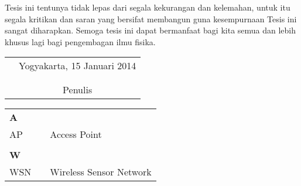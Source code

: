 \documentclass{jtetiskripsi}
\begin{document}
Tesis ini tentunya tidak lepas dari segala kekurangan dan kelemahan, untuk itu
segala kritikan dan saran yang bersifat membangun guna kesempurnaan Tesis ini
sangat diharapkan. Semoga tesis ini dapat bermanfaat bagi kita semua dan lebih
khusus lagi bagi pengembagan ilmu fisika.

\begin{tabular}{p{7.5cm}c}
&Yogyakarta, 15 Januari 2014\\
&\\
&\\
&Penulis
\end{tabular}

\tableofcontents
{}
\listoftables
{}
\listoffigures
{}

\singkatan
\noindent
\begin{tabular}{lp{3pt}l}

\textbf{A}\\
AP & & Access Point\\
\\
\textbf{W}\\
WSN & & Wireless Sensor Network\\

\end{tabular}
\end{document}

